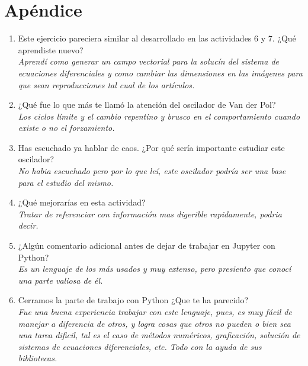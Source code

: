 \documentclass[12pt]{article}
\begin{document}


\section*{Apéndice}
\begin{enumerate}
\item Este ejercicio pareciera similar al desarrollado en las actividades 6 y 7. ¿Qué aprendiste nuevo?\\
\textit{Aprendí como generar un campo vectorial para la solucín del sistema de ecuaciones diferenciales y como cambiar las dimensiones en las imágenes para que sean reproducciones tal cual de los artículos.}
\item ¿Qué fue lo que más te llamó la atención del oscilador de Van der Pol?\\
\textit{Los ciclos límite y el cambio repentino y brusco en el comportamiento cuando existe o no el forzamiento.}
\item Has escuchado ya hablar de caos. ¿Por qué sería importante estudiar este oscilador?\\
\textit{No habia escuchado pero por lo que leí, este oscilador podría ser una base para el estudio del mismo.}
\item ¿Qué mejorarías en esta actividad?\\
\textit{Tratar de referenciar con información mas digerible rapidamente, podria decir.}
\item ¿Algún comentario adicional antes de dejar de trabajar en Jupyter con Python?\\
\textit{Es un lenguaje de los más usados y muy extenso, pero presiento que conocí una parte valiosa de él.}
\item Cerramos la parte de trabajo con Python ¿Que te ha parecido?\\
\textit{Fue una buena experiencia trabajar con este lenguaje, pues, es muy fácil de manejar a diferencia de otros, y logra cosas que otros no pueden o bien sea una tarea dificil, tal es el caso de métodos numéricos, graficación, solución de sistemas de ecuaciones diferenciales, etc. Todo con la ayuda de sus bibliotecas.}
\end{enumerate}
\end{document}
